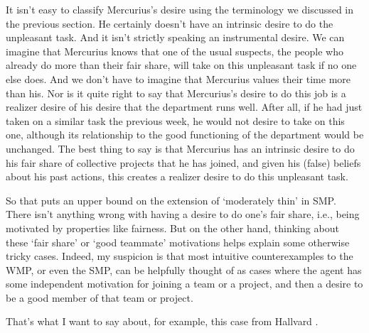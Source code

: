 It isn't easy to classify \gls{Mercurius}'s desire using the terminology we discussed in the previous section. He certainly doesn't have an intrinsic desire to do the unpleasant task. And it isn't strictly speaking an instrumental desire. We can imagine that \gls{Mercurius} knows that one of the usual suspects, the people who already do more than their fair share, will take on this unpleasant task if no one else does. And we don't have to imagine that \gls{Mercurius} values their time more than his. Nor is it quite right to say that \gls{Mercurius}'s desire to do this job is a realizer desire of his desire that the department runs well. After all, if he had just taken on a similar task the previous week, he would not desire to take on this one, although its relationship to the good functioning of the department would be unchanged. The best thing to say is that \gls{Mercurius} has an intrinsic desire to do his fair share of collective projects that he has joined, and given his (false) beliefs about his past actions, this creates a realizer desire to do this unpleasant task.

So that puts an upper bound on the extension of `moderately thin' in SMP. There isn't anything wrong with having a desire to do one's fair share, i.e., being motivated by properties like fairness. But on the other hand, thinking about these `fair share' or `good teammate' motivations helps explain some otherwise tricky cases. Indeed, my suspicion is that most intuitive counterexamples to the WMP, or even the SMP, can be helpfully thought of as cases where the agent has some independent motivation for joining a team or a project, and then a desire to be a good member of that team or project.

That's what I want to say about, for example, this case from Hallvard \citet{Lillehammer1997}.

